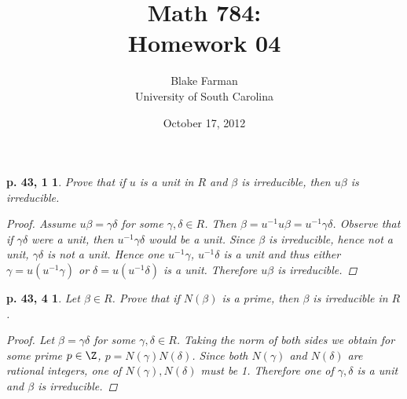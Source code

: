 \documentclass[10pt]{amsart}
\author{Blake Farman\\University of South Carolina}
\title{Math 784:\\Homework 04}
\date{October 17, 2012}
\begin{document}
\maketitle

\newtheorem*{ex1}{p. 43, 1}
\newtheorem*{ex2}{p. 43, 4}
\newtheorem*{ex3}{p. 47, 2}
\newtheorem{lem}{Lemma}

\begin{ex1}
  Prove that if $u$ is a unit in $R$ and $\beta$ is irreducible, then $u\beta$ is irreducible.
  
  \begin{proof}
    Assume $u\beta = \gamma\delta$ for some $\gamma, \delta \in R$.
    Then $\beta = u^{-1}u\beta = u^{-1}\gamma\delta$.
    Observe that if $\gamma\delta$ were a unit, then $u^{-1}\gamma\delta$ would be a unit.
    Since $\beta$ is irreducible, hence not a unit, $\gamma\delta$ is not a unit.
    Hence one $u^{-1}\gamma$, $u^{-1}\delta$ is a unit and thus either $\gamma = u(u^{-1}\gamma)$ or $\delta = u(u^{-1}\delta)$ is a unit.
    Therefore $u\beta$ is irreducible.
  \end{proof}
\end{ex1}

\begin{ex2}
  Let $\beta \in R$.
  Prove that if $N(\beta)$ is a prime, then $\beta$ is irreducible in $R$.
  
  \begin{proof}
    Let $\beta = \gamma\delta$ for some $\gamma,\delta \in R$.
    Taking the norm of both sides we obtain for some prime $p \in \Z$, $p = N(\gamma)N(\delta)$.
    Since both $N(\gamma)$ and $N(\delta)$ are rational integers, one of $N(\gamma), N(\delta)$ must be 1.
    Therefore one of $\gamma, \delta$ is a unit and $\beta$ is irreducible.
  \end{proof}
\end{ex2}
\end{document}
